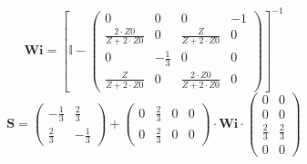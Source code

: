 \[ \mathbf{Wi} =  \left[ \mathbb{I}  - \left(\begin{array}{cccc} 0 & 0 & 0 & -1 \\ \frac{2\cdot Z0}{Z+2\cdot Z0} & 0 & \frac{Z}{Z+2\cdot Z0} & 0 \\ 0 & -\frac{1}{3} & 0 & 0 \\ \frac{Z}{Z+2\cdot Z0} & 0 & \frac{2\cdot Z0}{Z+2\cdot Z0} & 0 \end{array}\right) \right]^{-1}  \]
\[ \mathbf{S} = \left(\begin{array}{cc} -\frac{1}{3} & \frac{2}{3} \\ \frac{2}{3} & -\frac{1}{3} \end{array}\right) + \left(\begin{array}{cccc} 0 & \frac{2}{3} & 0 & 0 \\ 0 & \frac{2}{3} & 0 & 0 \end{array}\right) \cdot \mathbf{Wi} \cdot\left(\begin{array}{cc} 0 & 0 \\ 0 & 0 \\ \frac{2}{3} & \frac{2}{3} \\ 0 & 0 \end{array}\right) \]
